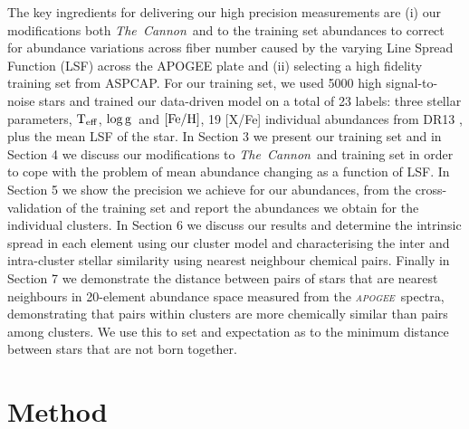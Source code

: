 \documentclass[14pt, preprint2]{aastex6}
\newcommand{\project}[1]{\textsl{#1}}
\newcommand{\tc}{\project{The~Cannon}}
\newcommand{\apogee}{\project{\textsc{apogee}}}
\newcommand{\teff}{\mbox{$\rm T_{eff}$}}
\newcommand{\feh}{\mbox{$\rm [Fe/H]$}}
\newcommand{\logg}{\mbox{$\rm \log g$}}
\begin{document}
The key ingredients for delivering our high precision measurements are (i) our modifications both \tc\ and to the training set abundances to correct for abundance variations across fiber number caused by the varying Line Spread Function (LSF) across the APOGEE plate and (ii) selecting a high fidelity training set from ASPCAP. For our training set, we used 5000 high signal-to-noise stars and trained our data-driven model on a total of 23 labels:  three stellar parameters, \teff, \logg\ and \feh, 19 [X/Fe] individual abundances from DR13 \citep[][Johnson et al., 2016, submitted]{Holtzman2015}, plus the mean LSF of the star.   In Section 3 we present our training set and in Section 4 we discuss our modifications to \tc\ and training set in order to cope with the problem of mean abundance changing as a function of LSF. In Section 5 we show the precision we achieve for our abundances, from the cross-validation of the training set and report the abundances we obtain for the individual clusters. In Section 6 we discuss our results and determine the intrinsic spread in each element using our cluster model and characterising the inter and intra-cluster stellar similarity using nearest neighbour chemical pairs.  Finally in Section 7 we demonstrate the distance between pairs of stars that are nearest neighbours in 20-element abundance space measured from the \apogee\ spectra, demonstrating that pairs within clusters are more chemically similar than pairs among clusters. We use this to set and expectation as to the minimum distance between stars that are not born together. 


\section{Method}
\end{document}

